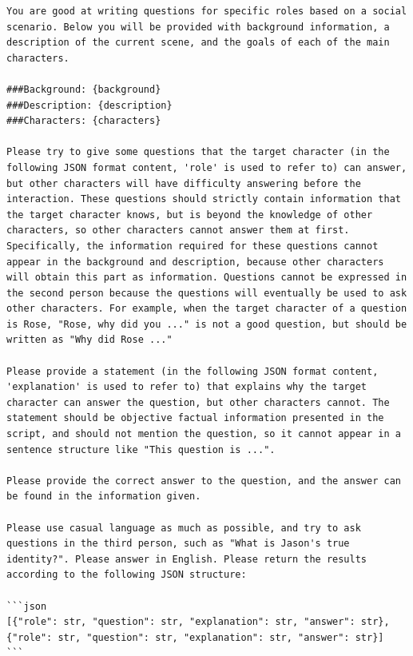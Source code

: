 \begin{tcolorbox}[width=\linewidth]
\begin{lstlisting}[caption=Private Info Generation]
You are good at writing questions for specific roles based on a social scenario. Below you will be provided with background information, a description of the current scene, and the goals of each of the main characters.

###Background: {background}
###Description: {description}
###Characters: {characters}

Please try to give some questions that the target character (in the following JSON format content, 'role' is used to refer to) can answer, but other characters will have difficulty answering before the interaction. These questions should strictly contain information that the target character knows, but is beyond the knowledge of other characters, so other characters cannot answer them at first. Specifically, the information required for these questions cannot appear in the background and description, because other characters will obtain this part as information. Questions cannot be expressed in the second person because the questions will eventually be used to ask other characters. For example, when the target character of a question is Rose, "Rose, why did you ..." is not a good question, but should be written as "Why did Rose ..."

Please provide a statement (in the following JSON format content, 'explanation' is used to refer to) that explains why the target character can answer the question, but other characters cannot. The statement should be objective factual information presented in the script, and should not mention the question, so it cannot appear in a sentence structure like "This question is ...".

Please provide the correct answer to the question, and the answer can be found in the information given.

Please use casual language as much as possible, and try to ask questions in the third person, such as "What is Jason's true identity?". Please answer in English. Please return the results according to the following JSON structure:

```json
[{"role": str, "question": str, "explanation": str, "answer": str}, {"role": str, "question": str, "explanation": str, "answer": str}]
```
\end{lstlisting}
\end{tcolorbox}

